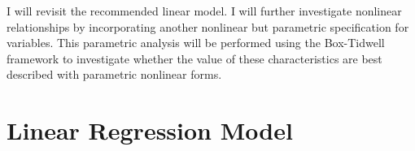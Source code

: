 %
%
%
%
%
%
%
%
%
%
%
%
%
%

I will revisit the recommended linear model.
I will further investigate nonlinear relationships
by incorporating another nonlinear but parametric specification
for variables.
This parametric analysis will be performed
using the Box-Tidwell framework
to investigate whether the value of these characteristics
are best described with parametric nonlinear forms. 

\section{Linear Regression Model}

